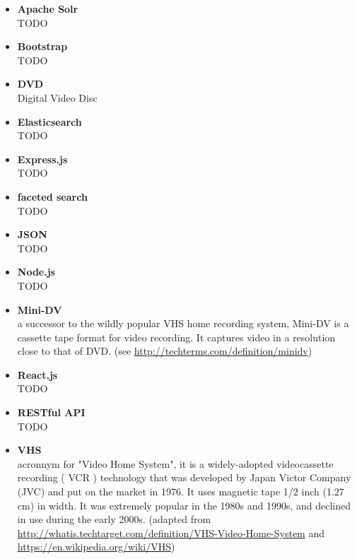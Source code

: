\begin{itemize}[leftmargin=*]
\label{glossary:apache-solr}
\item \textbf{Apache Solr} \\
	TODO
\label{glossary:bootstrap}
\item \textbf{Bootstrap} \\
	TODO
\label{glossary:dvd}
\item \textbf{DVD} \\
	Digital Video Disc
\label{glossary:elasticsearch}
\item \textbf{Elasticsearch} \\
	TODO
\label{glossary:express.js}
\item \textbf{Express.js} \\
	TODO
\label{glossary:faceted-search}
\item \textbf{faceted search} \\
	TODO
\label{glossary:json}
\item \textbf{JSON} \\
	TODO
\label{glossary:node.js}
\item \textbf{Node.js} \\
	TODO
\label{glossary:mini-dv}
\item \textbf{Mini-DV} \\
	a successor to the wildly popular VHS home recording system, Mini-DV is a cassette tape format for video recording. It captures video in a resolution close to that of DVD. (see \url{http://techterms.com/definition/minidv})
\label{glossary:react.js}
\item \textbf{React.js} \\
	TODO
\label{glossary:restful-api}
\item \textbf{RESTful API} \\
	TODO
\label{glossary:vhs}
\item \textbf{VHS} \\
	acronnym for "Video Home System", it is a widely-adopted videocassette recording ( VCR ) technology that was developed by Japan Victor Company (JVC) and put on the market in 1976. It uses magnetic tape 1/2 inch (1.27 cm) in width.  It was extremely popular in the 1980s and 1990s, and declined in use during the early 2000s. (adapted from \url{http://whatis.techtarget.com/definition/VHS-Video-Home-System} and \url{https://en.wikipedia.org/wiki/VHS})
\end{itemize}
